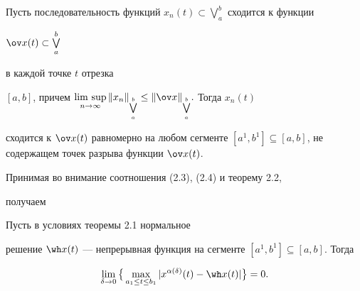 \begin{thms}


Пусть последовательность функций $x_n(t)


\subset \bigvee\limits_a^b $ сходится к функции


$\ov x(t)\subset \bigvee\limits_a^b$


в каждой точке $t$ отрезка


$[a,b]$, причем $\Limsup \limits_{n\to \infty}\|x_n\|_{\bigvee


\limits_a^b} \le \|\ov x\|_{\bigvee \limits_a^b}. $ Тогда $ x_n(t)$


сходится к $\ov x(t)$ равномерно на любом сегменте $[a^1,b^1]


\subseteq [a,b]$, не содержащем точек разрыва функции $\ov x(t)$.


\end{thms}





Принимая во внимание соотношения (2.3), (2.4) и теорему 2.2,


получаем





\begin{cornonum}


Пусть в условиях теоремы 2.1 нормальное


решение $\wh x(t)$ --- непрерывная функция на сегменте $[a^1,b^1]


\subseteq [a,b]$. Тогда


$$


\lim_{\delta \to 0}\big\{\max_{a_1\le t\le b_1}|x^{\alpha(\delta)}(t) -


\wh x(t)|\big\} = 0.


$$


\end{cornonum}





